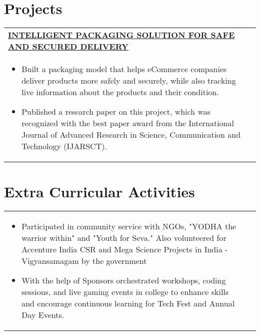 \documentclass[a4paper,8pt]{article}
\begin{document}
\section{Projects}
\begin{tabularx}{\linewidth}{ @{}l r@{} }
\color[HTML]{1C033C} \textbf{\uline{\href{https://www.researchgate.net/publication/349121386_Review_on_Intelligent_Packaging_Solution_for_Safe_and_Secured_Delivery}{INTELLIGENT PACKAGING SOLUTION FOR SAFE AND SECURED DELIVERY}}} \hfill \color[HTML]{371e77} \\[4pt]
\begin{minipage}[t]{\linewidth}
    \begin{itemize}[nosep,after=\strut, leftmargin=2em, itemsep=2pt]
        \item Built a packaging model that helps eCommerce companies deliver products more safely and securely, while also tracking live information about the products and their condition.
        \item Published a research paper on this project, which was recognized with the best paper award from the International Journal of Advanced Research in Science, Communication and Technology (IJARSCT). 
    \end{itemize}
    \end{minipage}
\end{tabularx}

\section{Extra Curricular Activities 
}
\begin{tabularx}{\linewidth}{ @{}l r@{} }

\begin{minipage}[t]{\linewidth}
    \begin{itemize}[nosep,after=\strut, leftmargin=2em, itemsep=2pt]
        \item Participated in community service with NGOs, "YODHA the warrior within" and "Youth for Seva." Also volunteered for Accenture India CSR and Mega Science Projects in India - Vigyansamagam by the government    
        \item With the help of Sponsors orchestrated workshops, coding sessions, and live gaming events in college to enhance skills and encourage continuous learning for Tech Fest and Annual Day Events.
    \end{itemize}
\end{minipage}
\end{tabularx}
\end{document}
